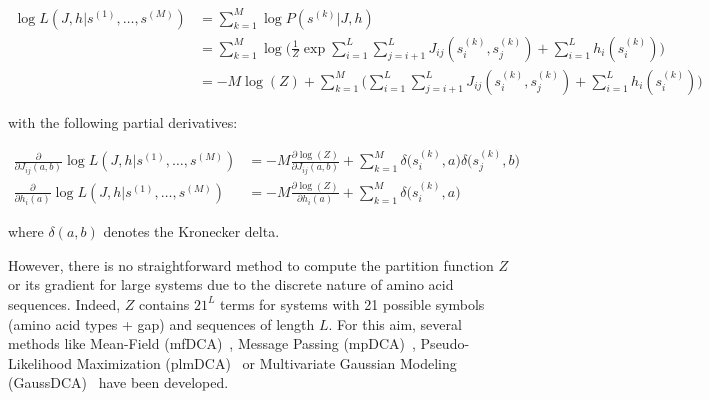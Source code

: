         \begin{equation}
            \begin{split}
                \log{L}(J, h \vert s^{(1)}, \dotsc, s^{(M)}) & = \sum\limits_{k=1}^M \log P(s^{(k)} \vert J, h) \\
                & = \sum\limits_{k=1}^M \log \Bigg( \frac{1}{Z} \exp{\sum\limits_{i=1}^L
                    \sum\limits_{j=i+1}^L J_{ij}(s_i^{(k)}, s_j^{(k)}) + \sum\limits_{i=1}^L h_i(s_i^{(k)})} \Bigg) \\
                & = -M \log(Z) + \sum\limits_{k=1}^M \Big( \sum\limits_{i=1}^L \sum\limits_{j=i+1}^L J_{ij}(s_i^{(k)}, s_j^{(k)})
                    + \sum\limits_{i=1}^L h_i(s_i^{(k)}) \Big)
            \end{split}
        \end{equation}

        with the following partial derivatives:

        \begin{equation}
            \begin{split}
                \frac{\partial}{\partial J_{ij}(a, b)} \log{L}(J, h \vert s^{(1)}, \dotsc, s^{(M)}) & =
                    -M \frac{\partial \log(Z)}{\partial J_{ij}(a, b)} + \sum\limits_{k=1}^M \delta\Big(s_i^{(k)}, a\Big) \delta\Big(s_j^{(k)}, b\Big) \\
                 \frac{\partial}{\partial h_{i}(a)} \log{L}(J, h \vert s^{(1)}, \dotsc, s^{(M)}) & =
                    -M \frac{\partial \log(Z)}{\partial h_{i}(a)} + \sum\limits_{k=1}^M \delta\Big(s_i^{(k)}, a\Big)
            \end{split}
        \end{equation}

        where $\delta(a, b)$ denotes the Kronecker delta.  %

        However, there is no straightforward method to compute the partition function $Z$ or its gradient for large  %
        systems due to the discrete nature of amino acid sequences. Indeed, $Z$ contains $21^L$ terms for systems with 21 possible symbols (amino acid types + gap)
        and sequences of length $L$. For this aim, several methods like Mean-Field (mfDCA)~\cite{MorcosE1293}, Message Passing (mpDCA)~\cite{Weigt2009},
        Pseudo-Likelihood Maximization (plmDCA)~\cite{EKEBERG2014341} or Multivariate Gaussian Modeling (GaussDCA)~\cite{10.1371/journal.pone.0092721}
        have been developed.

